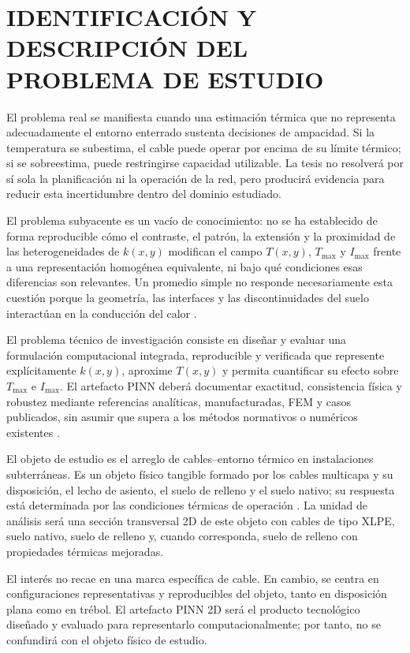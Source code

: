 \documentclass[11pt,a4paper,oneside]{report}
\newcommand{\Tmax}{T_{\max}}
\newcommand{\Imax}{I_{\max}}
\newcommand{\kx}{k(x,y)}
\begin{document}
\section{IDENTIFICACIÓN Y DESCRIPCIÓN DEL PROBLEMA DE ESTUDIO}
\label{sec:planteamiento-problema}

El problema real se manifiesta cuando una estimación térmica que no representa adecuadamente el entorno enterrado sustenta decisiones de ampacidad. Si la temperatura se subestima, el cable puede operar por encima de su límite térmico; si se sobreestima, puede restringirse capacidad utilizable. La tesis no resolverá por sí sola la planificación ni la operación de la red, pero producirá evidencia para reducir esta incertidumbre dentro del dominio estudiado.

El problema subyacente es un vacío de conocimiento: no se ha establecido de forma reproducible cómo el contraste, el patrón, la extensión y la proximidad de las heterogeneidades de $\kx$ modifican el campo $T(x,y)$, $\Tmax$ y $\Imax$ frente a una representación homogénea equivalente, ni bajo qué condiciones esas diferencias son relevantes. Un promedio simple no responde necesariamente esta cuestión porque la geometría, las interfaces y las discontinuidades del suelo interactúan en la conducción del calor \parencites[4--6]{enescu2021}[3--4,93--99]{cigre2025}.

El problema técnico de investigación consiste en diseñar y evaluar una formulación computacional integrada, reproducible y verificada que represente explícitamente $\kx$, aproxime $T(x,y)$ y permita cuantificar su efecto sobre $\Tmax$ e $\Imax$. El artefacto PINN deberá documentar exactitud, consistencia física y robustez mediante referencias analíticas, manufacturadas, FEM y casos publicados, sin asumir que supera a los métodos normativos o numéricos existentes \parencites{iec60287}{iec60853}[3--4,93--99]{cigre2025}[686--690]{raissi2019}.

El objeto de estudio es el arreglo de cables--entorno térmico en instalaciones subterráneas. Es un objeto físico tangible formado por los cables multicapa y su disposición, el lecho de asiento, el suelo de relleno y el suelo nativo; su respuesta está determinada por las condiciones térmicas de operación \parencites[3--6]{enescu2021}{ieee442}[1,10]{kim2025}. La unidad de análisis será una sección transversal 2D de este objeto con cables de tipo XLPE, suelo nativo, suelo de relleno y, cuando corresponda, suelo de relleno con propiedades térmicas mejoradas.

El interés no recae en una marca específica de cable. En cambio, se centra en configuraciones representativas y reproducibles del objeto, tanto en disposición plana como en trébol. El artefacto PINN 2D será el producto tecnológico diseñado y evaluado para representarlo computacionalmente; por tanto, no se confundirá con el objeto físico de estudio.
\end{document}
